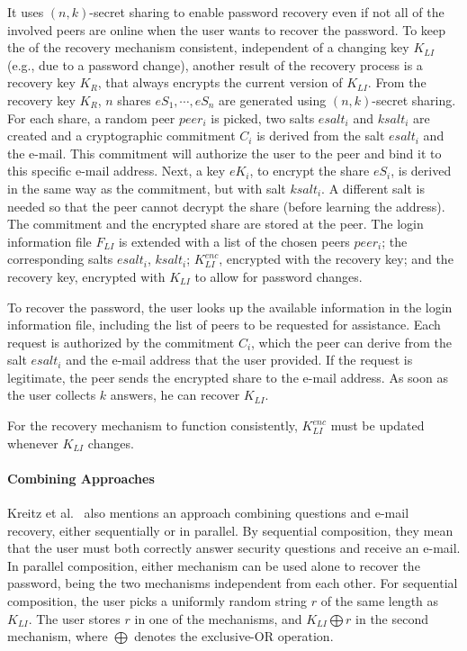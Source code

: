  It uses $(n, k)$-secret sharing to enable password recovery even
 if not all of the involved peers are online when the user wants
 to recover the password.
 To keep the of the recovery mechanism consistent, independent of a changing key $K_{LI}$ (e.g., due to a password change),
 another result of the recovery process is a recovery key $K_R$,
 that always encrypts the current version of $K_{LI}$.
  From the recovery key $K_R$, $n$
 shares $eS_1, \cdots, eS_n$ are generated using $(n, k)$-secret sharing.
 For each share, a random peer $peer_i$ is picked, two salts $esalt_i$
 and $ksalt_i$ are created and a cryptographic commitment $C_i$ is
 derived from the salt $esalt_i$ and the e-mail. This
 commitment will authorize the user to the peer
 and bind it to this specific e-mail address. Next, a key $eK_i$,
 to encrypt the share $eS_i$, is derived in the same way as the
 commitment, but with salt $ksalt_i$. A different salt is needed
 so that the peer cannot decrypt the share (before learning the
 address). The commitment and the encrypted share are stored
 at the peer. The login information file $F_{LI}$ is extended with a
 list of the chosen peers $peer_i$; the corresponding salts $esalt_i$,
 $ksalt_i$; $K_{LI}^{enc}$, encrypted with the recovery key; and
 the recovery key, encrypted with $K_{LI}$ to allow for password
 changes.

 To recover the password, the user looks up the
 available information in the login information file, including
 the list of peers to be requested for assistance. Each request is
 authorized by the commitment $C_i$, which the peer can derive
 from the salt $esalt_i$ and the e-mail address that the user
 provided. If the request is legitimate, the peer
 sends the encrypted share to the e-mail address. As soon as
 the user collects $k$ answers, he can recover $K_{LI}$.

 For the recovery mechanism to function consistently, $K_{LI}^{enc}$
 must be updated whenever $K_{LI}$ changes.
 
 \paragraph{Combining Approaches}
 Kreitz et al.~\cite{kreitz2012passwords} also mentions an approach combining
questions and e-mail recovery, either
sequentially or in parallel.
  By sequential composition, they mean
 that the user must both correctly answer security questions and
 receive an e-mail. In parallel composition, either
 mechanism can be used alone to recover the password, being the two mechanisms independent from each other.
 For sequential composition, the user picks a uniformly
 random string $r$ of the same length as $K_{LI}$. The user stores $r$ in
one of the mechanisms, and $K_{LI} \bigoplus r$ in the second mechanism, where
$\bigoplus $ denotes the exclusive-OR operation.

